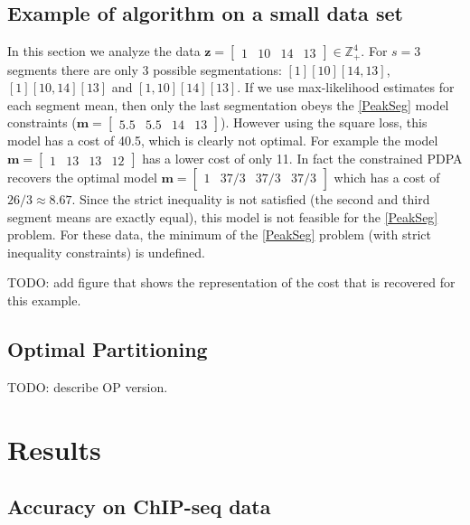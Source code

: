 \documentclass{article}
\newcommand{\ZZ}{\mathbb Z}
\begin{document}
\subsection{Example of algorithm on a small data set}

In this section we analyze the data
$\mathbf z = \left[\begin{array}{cccc} 1 & 10 & 14 & 13
\end{array}\right]\in\ZZ_+^4
$. For $s=3$ segments there are only 3 possible segmentations:
$[1][10][14, 13]$, $[1][10, 14][13]$ and $[1, 10][14][13]$. If we use
max-likelihood estimates for each segment mean, then only the last
segmentation obeys the \ref{PeakSeg} model constraints
($\mathbf m =\left[\begin{array}{cccc} 5.5 & 5.5 & 14 &
    13\end{array}\right]$). However using the square loss, this model
has a cost of 40.5, which is clearly not optimal. For example the
model
$\mathbf m =\left[\begin{array}{cccc} 1 & 13 & 13 &
    12\end{array}\right]$ has a lower cost of only 11. In fact the
constrained PDPA recovers the optimal model
$\mathbf m =\left[\begin{array}{cccc} 1 & 37/3 & 37/3 &
    37/3\end{array}\right]$ which has a cost of $26/3\approx
8.67$. Since the strict inequality is not satisfied (the second and
third segment means are exactly equal), this model is not feasible for
the \ref{PeakSeg} problem. For these data, the minimum of the
\ref{PeakSeg} problem (with strict inequality constraints) is
undefined.

TODO: add figure that shows the representation of the cost that is
recovered for this example.

\subsection{Optimal Partitioning}

TODO: describe OP version.



\section{Results}

\subsection{Accuracy on ChIP-seq data}
\end{document}
